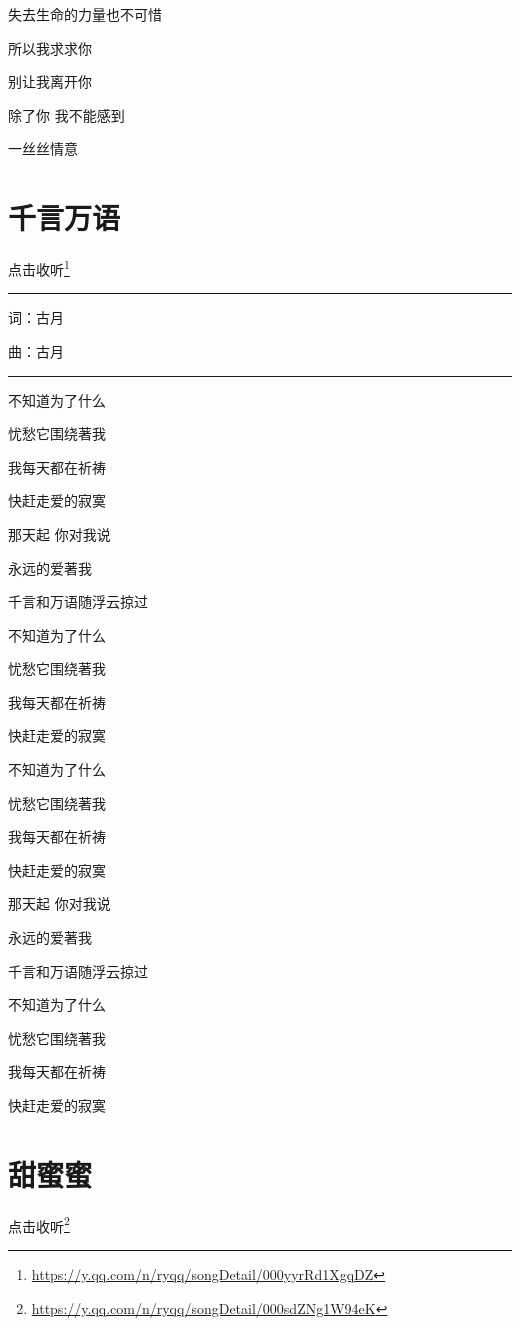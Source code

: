 \documentclass[]{ctexbook}
\renewcommand{\href}[2]{#2\footnote{\url{#1}}}
\begin{document}
失去生命的力量也不可惜

所以我求求你

别让我离开你

除了你 我不能感到

一丝丝情意

\section*{千言万语}\label{thousands-of-words}


\href{https://y.qq.com/n/ryqq/songDetail/000yyrRd1XgqDZ}{点击收听}

\begin{center}\rule{0.5\linewidth}{0.5pt}\end{center}

词：古月

曲：古月

\begin{center}\rule{0.5\linewidth}{0.5pt}\end{center}

不知道为了什么

忧愁它围绕著我

我每天都在祈祷

快赶走爱的寂寞

那天起 你对我说

永远的爱著我

千言和万语随浮云掠过

不知道为了什么

忧愁它围绕著我

我每天都在祈祷

快赶走爱的寂寞

不知道为了什么

忧愁它围绕著我

我每天都在祈祷

快赶走爱的寂寞

那天起 你对我说

永远的爱著我

千言和万语随浮云掠过

不知道为了什么

忧愁它围绕著我

我每天都在祈祷

快赶走爱的寂寞

\section*{甜蜜蜜}\label{sweet}


\href{https://y.qq.com/n/ryqq/songDetail/000sdZNg1W94eK}{点击收听}
\end{document}

